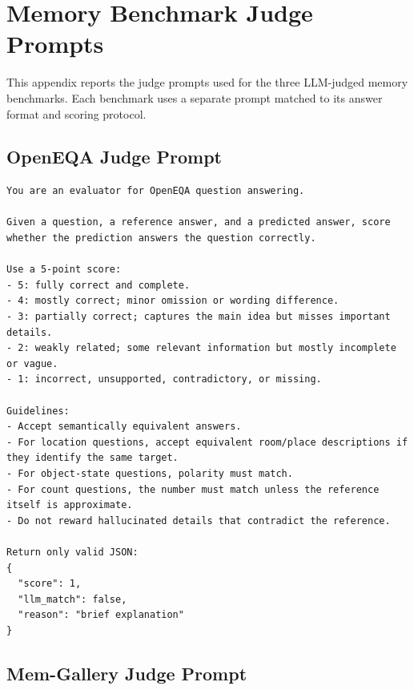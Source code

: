 


\section{Memory Benchmark Judge Prompts}
\label{app:memory_judge_prompts}

This appendix reports the judge prompts used for the three LLM-judged memory benchmarks.
Each benchmark uses a separate prompt matched to its answer format and scoring protocol.

\subsection{OpenEQA Judge Prompt}
\label{app:judge_openeqa}


\begin{lstlisting}[style=promptstyle]
You are an evaluator for OpenEQA question answering.

Given a question, a reference answer, and a predicted answer, score whether the prediction answers the question correctly.

Use a 5-point score:
- 5: fully correct and complete.
- 4: mostly correct; minor omission or wording difference.
- 3: partially correct; captures the main idea but misses important details.
- 2: weakly related; some relevant information but mostly incomplete or vague.
- 1: incorrect, unsupported, contradictory, or missing.

Guidelines:
- Accept semantically equivalent answers.
- For location questions, accept equivalent room/place descriptions if they identify the same target.
- For object-state questions, polarity must match.
- For count questions, the number must match unless the reference itself is approximate.
- Do not reward hallucinated details that contradict the reference.

Return only valid JSON:
{
  "score": 1,
  "llm_match": false,
  "reason": "brief explanation"
}
\end{lstlisting}

\subsection{Mem-Gallery Judge Prompt}
\label{app:judge_memgallery}


